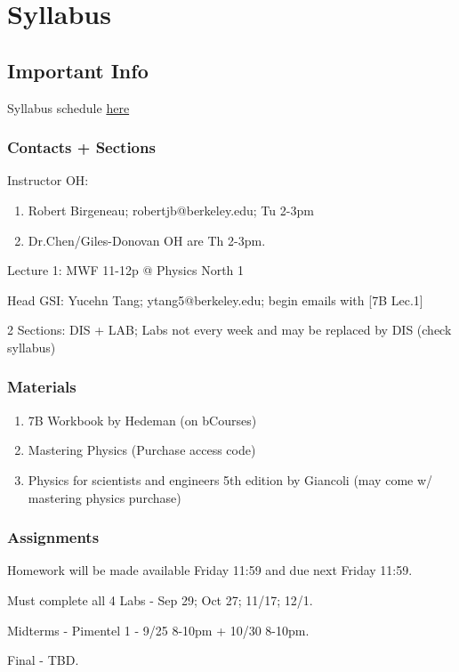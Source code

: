 \chapter{Syllabus}

\section{Important Info}

Syllabus schedule \href{https://docs.google.com/document/d/18wrHqKKPf9Vbl-r-mopfYQIKEQknNPHI/edit}{here} 

\subsection{Contacts + Sections}
    Instructor OH:
    \begin{enumerate}
        \item   Robert Birgeneau; robertjb@berkeley.edu; Tu 2-3pm
        \item Dr.Chen/Giles-Donovan OH are Th 2-3pm.
    \end{enumerate}

    Lecture 1: MWF 11-12p @ Physics North 1  

    Head GSI: Yucehn Tang; ytang5@berkeley.edu; begin emails with [7B Lec.1] 

    2 Sections: DIS + LAB; Labs not every week and may be replaced by DIS (check syllabus) 

\subsection{Materials}
    \begin{enumerate}
        \item 7B Workbook by Hedeman (on bCourses)
        \item Mastering Physics (Purchase access code)
        \item Physics for scientists and engineers 5th edition by Giancoli (may come w/ mastering physics purchase)
    \end{enumerate}

\subsection{Assignments}
    Homework will be made available Friday 11:59 and due next Friday 11:59. 

    Must complete all 4 Labs - Sep 29; Oct 27; 11/17; 12/1. 

    Midterms - Pimentel 1 - 9/25 8-10pm + 10/30 8-10pm. 

    Final - TBD.